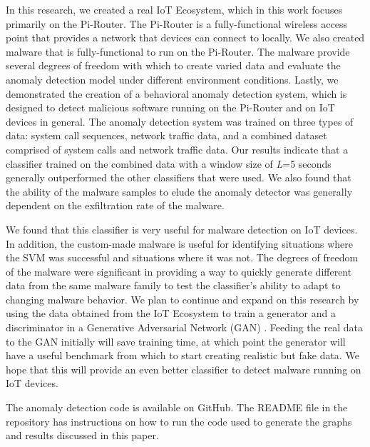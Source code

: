 \documentclass[runningheads]{llncs}
\begin{document}
\indent In this research, we created a real IoT Ecosystem, which in this work focuses primarily on the Pi-Router. The Pi-Router is a fully-functional wireless access point that provides a network that devices can connect to locally. We also created malware that is fully-functional to run on the Pi-Router. The malware provide several degrees of freedom with which to create varied data and evaluate the anomaly detection model under different environment conditions. Lastly, we demonstrated the creation of a behavioral anomaly detection system, which is designed to detect malicious software running on the Pi-Router and on IoT devices in general. The anomaly detection system was trained on three types of data: system call sequences, network traffic data, and a combined dataset comprised of system calls and network traffic data. Our results indicate that a classifier trained on the combined data with a window size of \emph{L}=5 seconds generally outperformed the other classifiers that were used. We also found that the ability of the malware samples to elude the anomaly detector was generally dependent on the exfiltration rate of the malware.

\indent We found that this classifier is very useful for malware detection on IoT devices. In addition, the custom-made malware is useful for identifying situations where the SVM was successful and situations where it was not. The degrees of freedom of the malware were significant in providing a way to quickly generate different data from the same malware family to test the classifier's ability to adapt to changing malware behavior. We plan to continue and expand on this research by using the data obtained from the IoT Ecosystem to train a generator and a discriminator in a Generative Adversarial Network (GAN) \cite{nids1}. Feeding the real data to the GAN initially will save training time, at which point the generator will have a useful benchmark from which to start creating realistic but fake data. We hope that this will provide an even better classifier to detect malware running on IoT devices.

\indent The anomaly detection code is available on GitHub. The README file in the repository has instructions on how to run the code used to generate the graphs and results discussed in this paper.


\printbibliography

%
%
\end{document}
